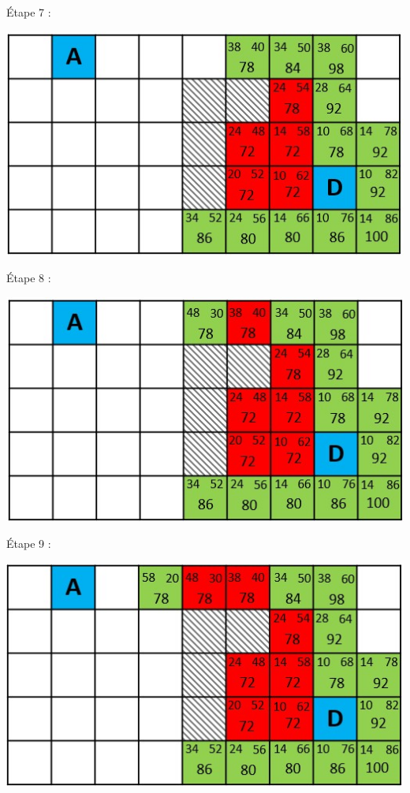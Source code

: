 \'Etape 7 :
\begin{center}
\includegraphics[scale=0.8]{images/quadri9.jpg}
\end{center}


\'Etape 8 :
\begin{center}
\includegraphics[scale=0.8]{images/quadri10.jpg}
\end{center}

\newpage
\'Etape 9 :
\begin{center}
\includegraphics[scale=0.8]{images/quadri11.jpg}
\end{center}

